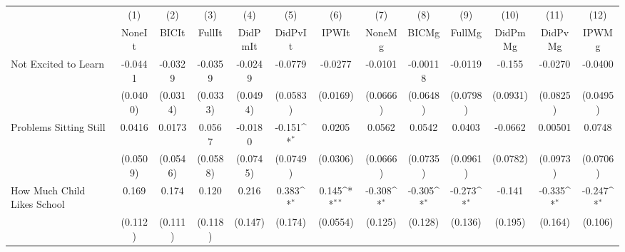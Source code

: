 {
\def\sym#1{\ifmmode^{#1}\else\(^{#1}\)\fi}
\begin{tabular}{l*{12}{c}}
\toprule
            &\multicolumn{1}{c}{(1)}&\multicolumn{1}{c}{(2)}&\multicolumn{1}{c}{(3)}&\multicolumn{1}{c}{(4)}&\multicolumn{1}{c}{(5)}&\multicolumn{1}{c}{(6)}&\multicolumn{1}{c}{(7)}&\multicolumn{1}{c}{(8)}&\multicolumn{1}{c}{(9)}&\multicolumn{1}{c}{(10)}&\multicolumn{1}{c}{(11)}&\multicolumn{1}{c}{(12)}\\
            &\multicolumn{1}{c}{NoneIt}&\multicolumn{1}{c}{BICIt}&\multicolumn{1}{c}{FullIt}&\multicolumn{1}{c}{DidPmIt}&\multicolumn{1}{c}{DidPvIt}&\multicolumn{1}{c}{IPWIt}&\multicolumn{1}{c}{NoneMg}&\multicolumn{1}{c}{BICMg}&\multicolumn{1}{c}{FullMg}&\multicolumn{1}{c}{DidPmMg}&\multicolumn{1}{c}{DidPvMg}&\multicolumn{1}{c}{IPWMg}\\
\midrule
Not Excited to Learn&     -0.0441         &     -0.0329         &     -0.0359         &     -0.0249         &     -0.0779         &     -0.0277         &     -0.0101         &    -0.00118         &     -0.0119         &      -0.155         &     -0.0270         &     -0.0400         \\
            &    (0.0400)         &    (0.0314)         &    (0.0333)         &    (0.0494)         &    (0.0583)         &    (0.0169)         &    (0.0666)         &    (0.0648)         &    (0.0798)         &    (0.0931)         &    (0.0825)         &    (0.0495)         \\
\addlinespace
Problems Sitting Still&      0.0416         &      0.0173         &      0.0567         &     -0.0180         &      -0.151\sym{*}  &      0.0205         &      0.0562         &      0.0542         &      0.0403         &     -0.0662         &     0.00501         &      0.0748         \\
            &    (0.0509)         &    (0.0546)         &    (0.0588)         &    (0.0745)         &    (0.0749)         &    (0.0306)         &    (0.0666)         &    (0.0735)         &    (0.0961)         &    (0.0782)         &    (0.0973)         &    (0.0706)         \\
\addlinespace
How Much Child Likes School&       0.169         &       0.174         &       0.120         &       0.216         &       0.383\sym{*}  &       0.145\sym{**} &      -0.308\sym{*}  &      -0.305\sym{*}  &      -0.273\sym{*}  &      -0.141         &      -0.335\sym{*}  &      -0.247\sym{*}  \\
            &     (0.112)         &     (0.111)         &     (0.118)         &     (0.147)         &     (0.174)         &    (0.0554)         &     (0.125)         &     (0.128)         &     (0.136)         &     (0.195)         &     (0.164)         &     (0.106)         \\

\end{tabular}}
